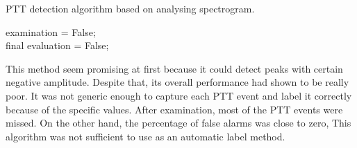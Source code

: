     \vspace{0.5cm}
    \begin{algorithm}
    \caption{PTT detection algorithm based on analysing spectrogram.}\label{alg:one}
        
        \vspace{0.3cm}
        \SetNlSkip{-2.0em}
        \SetNlSty{}{}{:}
        \Indp
        \Indp  
        examination = False;\\
        final evaluation = False;
        
        
    
    \end{algorithm}


    This method seem promising at first because it could detect peaks with certain negative amplitude. Despite that, its overall performance had shown to be really poor. It was not generic enough to capture each PTT event and label it correctly because of the specific values. After examination, most of the PTT events were missed. On the other hand, the percentage of false alarms was close to zero, This algorithm was not sufficient to use as an automatic label method. 

